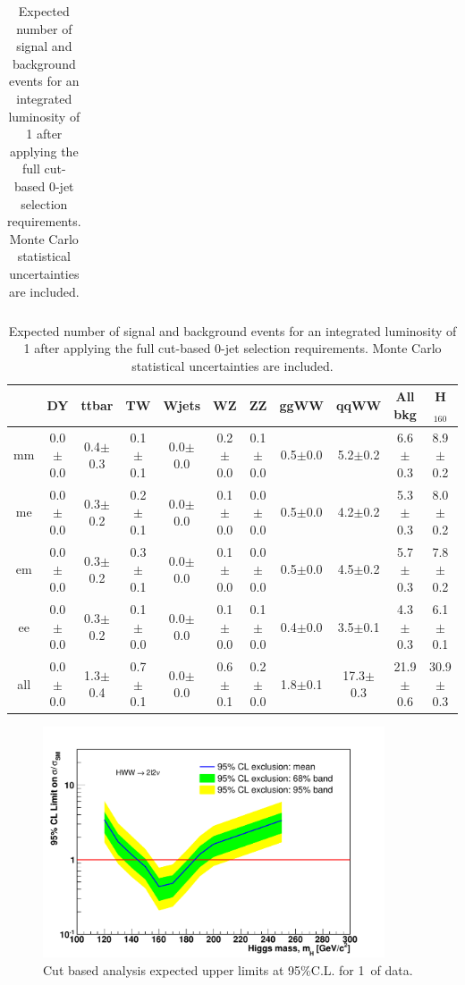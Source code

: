 \begin{table}[!ht]
\begin{center}
{\begin{tabular} {|c|c|c|c|c|c|c|c|c||c||c|}
 \hline
  \end{tabular}
  }
 {\footnotesize
  \begin{tabular} {|c|c|c|c|c|c|c|c|c||c||c|}
\hline
  & DY & ttbar & TW & Wjets & WZ & ZZ & ggWW & qqWW & {\bf All bkg} & {\bf H$_{160}$}\\
  \hline
  \hline
  mm & 0.0$\pm$0.0 &  0.4$\pm$0.3 &  0.1$\pm$0.1 &  0.0$\pm$0.0 &  0.2$\pm$0.0 &  0.1$\pm$0.0 &  0.5$\pm$0.0 &  5.2$\pm$0.2 &  6.6$\pm$0.3 & 8.9$\pm$0.2 \\
  me & 0.0$\pm$0.0 &  0.3$\pm$0.2 &  0.2$\pm$0.1 &  0.0$\pm$0.0 &  0.1$\pm$0.0 &  0.0$\pm$0.0 &  0.5$\pm$0.0 &  4.2$\pm$0.2 &  5.3$\pm$0.3 & 8.0$\pm$0.2 \\
  em & 0.0$\pm$0.0 &  0.3$\pm$0.2 &  0.3$\pm$0.1 &  0.0$\pm$0.0 &  0.1$\pm$0.0 &  0.0$\pm$0.0 &  0.5$\pm$0.0 &  4.5$\pm$0.2 &  5.7$\pm$0.3 & 7.8$\pm$0.2 \\
  ee & 0.0$\pm$0.0 &  0.3$\pm$0.2 &  0.1$\pm$0.0 &  0.0$\pm$0.0 &  0.1$\pm$0.0 &  0.1$\pm$0.0 &  0.4$\pm$0.0 &  3.5$\pm$0.1 &  4.3$\pm$0.3 & 6.1$\pm$0.1 \\
 \hline
 all & 0.0$\pm$0.0 &  1.3$\pm$0.4 &  0.7$\pm$0.1 &  0.0$\pm$0.0 &  0.6$\pm$0.1 &  0.2$\pm$0.0 &  1.8$\pm$0.1 & 17.3$\pm$0.3 & 21.9$\pm$0.6 & 30.9$\pm$0.3 \\
 \hline
  \end{tabular}
  }
  \caption{Expected number of signal and background events for an 
  integrated luminosity of 1\ifb{} after 
  applying the full cut-based 0-jet selection requirements. Monte Carlo statistical uncertainties are 
  included.}
   \label{tab:cutbase_yeilds}
  \end{center}
\end{table}



\begin{figure}[!htbp]
\begin{center}
   \includegraphics[width=0.9\textwidth]{figures/cut_based_limits.pdf}
   \caption{Cut based analysis expected upper limits at 95\%C.L. for 1\ifb\ of data.}
   \label{fig:cutbase_uls}
\end{center}
\end{figure}
